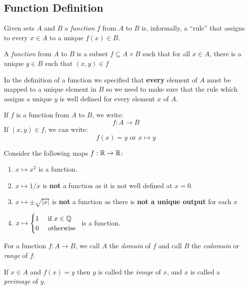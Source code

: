\documentclass[../main.tex]{subfiles}
\begin{document}
\subsection{Function Definition}
  Given sets $A$ and $B$ a \textit{function} $f$ from $A$ to $B$ is, informally, a ``rule'' that assigns to every $x \in A$ to a unique $f(x) \in B$.
\begin{definition}[Function]
  A \textit{function} from $A$ to $B$ is a subset $f \subseteq A \times B$ such that for all $x \in A$, there is a unique $y \in B$ such that $(x, y) \in f$
\end{definition}
\begin{remark}[Warning]
  In the definition of a function we specified that \textbf{every} element of $A$ must be mapped to a unique element in $B$ so we need to make sure that the rule which assigns a unique $y$ is well defined for every element $x$ of $A$.
\end{remark}
\begin{remark}[Notation]
  If $f$ is a function from $A$ to $B$, we write:
  \[
    f: A \to B
  \]
  If $(x, y) \in f$, we can write:
  \[
    f(x) = y \text{ or } x \mapsto y
  \]
\end{remark}
\begin{example}
  Consider the following maps $f: \mathbb{R} \to \mathbb{R}$:
  \begin{enumerate}
    \item $x \mapsto x^2$ is a function.
    \item $x \mapsto 1/x$ is \textbf{not} a function as it is not well defined at $x = 0$.
    \item $x \mapsto \pm\sqrt{|x|}$ is \textbf{not} a function as there is \textbf{not a unique output} for each $x$
    \item $
        x \mapsto \begin{cases}
        1 & \text{ if } x \in \mathbb{Q} \\
        0 & \text{ otherwise }
        \end{cases}
        $ is a function.
  \end{enumerate}
\end{example}
\begin{definition}
  For a function $f: A \to B$, we call $A$ the \textit{domain} of $f$ and call $B$ the \textit{codomain} or \textit{range} of $f$.
\end{definition}
\begin{definition}
  If $x \in A$ and $f(x) = y$ then $y$ is called the \textit{image} of $x$, and $x$ is called a \textit{preimage} of $y$.
\end{definition}
\end{document}
